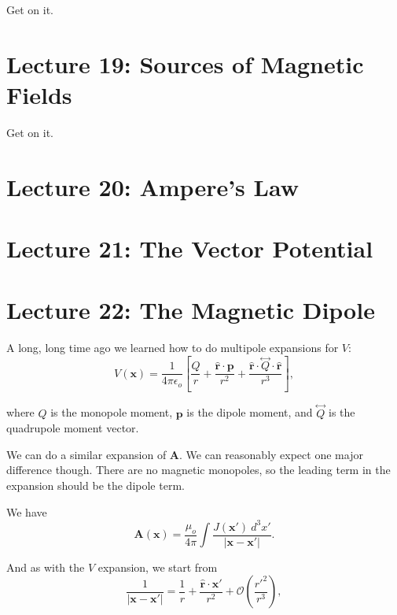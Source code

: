 \documentclass{article}
\numberwithin{equation}{section}
\newcommand{\rhat}{\mathbf{\hat{r}}}
\begin{document}
Get on it.

\newpage

\section*{Lecture 19: Sources of Magnetic Fields}
\setcounter{page}{1}

Get on it.

\newpage

\section*{Lecture 20: Ampere's Law}
\setcounter{page}{1}


\newpage

\section*{Lecture 21: The Vector Potential}
\setcounter{page}{1}


\newpage

\section*{Lecture 22: The Magnetic Dipole}
\setcounter{page}{1}


A long, long time ago we learned how to do multipole expansions for $V$:
\begin{equation*}
    V(\bm{x}) = \frac{1}{4\pi\epsilon_o} \left[ \frac{Q}{r} + \frac{\rhat \cdot \bm{p}}{r^2} + \frac{\rhat \cdot \overset{\longleftrightarrow}{Q} \cdot \rhat}{r^3} \right],
\end{equation*}

where $Q$ is the monopole moment, $\bm{p}$ is the dipole moment, and $\overset{\longleftrightarrow}{Q}$ is the quadrupole moment vector.

We can do a similar expansion of $\bm{A}$. We can reasonably expect one major difference though. There are no magnetic monopoles, so the leading term in the expansion should be the dipole term.

We have
\begin{equation*}
    \bm{A}(\bm{x}) = \frac{\mu_o}{4\pi} \int \frac{J(\bm{x}')\ d^3x'}{\left| \bm{x} - \bm{x}' \right|}.
\end{equation*}

And as with the $V$ expansion, we start from
\begin{equation*}
    \frac{1}{\left| \bm{x} - \bm{x}' \right|} = \frac{1}{r} + \frac{\rhat \cdot \bm{x}'}{r^2} + \mathcal{O}\left( \frac{r'^2}{r^3} \right),
\end{equation*}
\end{document}
